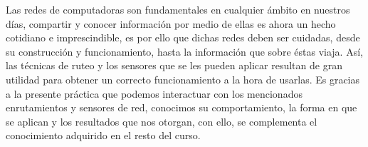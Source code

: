 \noindent
Las redes de computadoras son fundamentales en cualquier ámbito en nuestros días, compartir y conocer información por medio de ellas es ahora un hecho cotidiano e imprescindible, es por ello que dichas redes deben ser cuidadas, desde su construcción y funcionamiento, hasta la información que sobre éstas viaja. Así, las técnicas de ruteo y los sensores que se les pueden aplicar resultan de gran utilidad para obtener un correcto funcionamiento a la hora de usarlas. Es gracias a la presente práctica que podemos interactuar con los mencionados enrutamientos y sensores de red, conocimos su comportamiento, la forma en que se aplican y los resultados que nos otorgan, con ello, se complementa el conocimiento adquirido en el resto del curso.